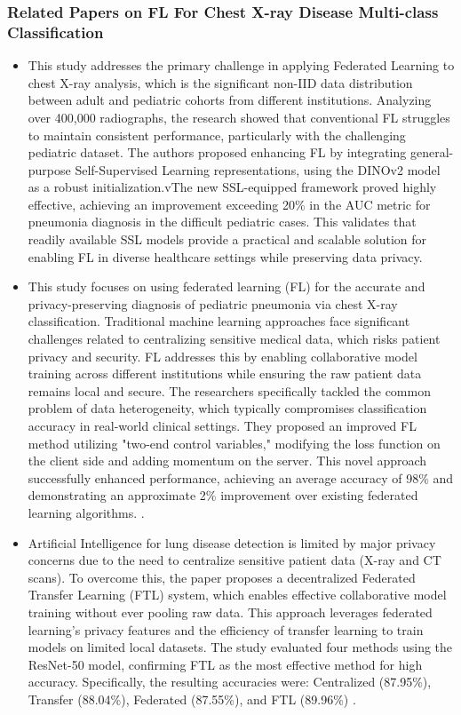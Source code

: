 \subsubsection{Related Papers on FL For Chest X-ray Disease Multi-class Classification}
\begin{itemize} \itemsep 10pt
	\item This study addresses the primary challenge in applying Federated Learning to chest X-ray analysis, which is the significant non-IID data distribution between adult and pediatric cohorts from different institutions. Analyzing over 400,000 radiographs, the research showed that conventional FL struggles to maintain consistent performance, particularly with the challenging pediatric dataset. The authors proposed enhancing FL by integrating general-purpose Self-Supervised Learning representations, using the DINOv2 model as a robust initialization.vThe new SSL-equipped framework proved highly effective, achieving an improvement exceeding 20\% in the AUC metric for pneumonia diagnosis in the difficult pediatric cases. This validates that readily available SSL models provide a practical and scalable solution for enabling FL in diverse healthcare settings while preserving data privacy\cite{ref33}.
	\item This study focuses on using federated learning (FL) for the accurate and privacy-preserving diagnosis of pediatric pneumonia via chest X-ray classification. Traditional machine learning approaches face significant challenges related to centralizing sensitive medical data, which risks patient privacy and security. FL addresses this by enabling collaborative model training across different institutions while ensuring the raw patient data remains local and secure. The researchers specifically tackled the common problem of data heterogeneity, which typically compromises classification accuracy in real-world clinical settings. They proposed an improved FL method utilizing "two-end control variables," modifying the loss function on the client side and adding momentum on the server. This novel approach successfully enhanced performance, achieving an average accuracy of 98\% and demonstrating an approximate 2\% improvement over existing federated learning algorithms. \cite{ref33}.
	\item Artificial Intelligence for lung disease detection is limited by major privacy concerns due to the need to centralize sensitive patient data (X-ray and CT scans). To overcome this, the paper proposes a decentralized Federated Transfer Learning (FTL) system, which enables effective collaborative model training without ever pooling raw data. This approach leverages federated learning's privacy features and the efficiency of transfer learning to train models on limited local datasets. The study evaluated four methods using the ResNet-50 model, confirming FTL as the most effective method for high accuracy. Specifically, the resulting accuracies were: Centralized (87.95\%), Transfer (88.04\%), Federated (87.55\%), and FTL (89.96\%) \cite{ref34}.

\end{itemize}
